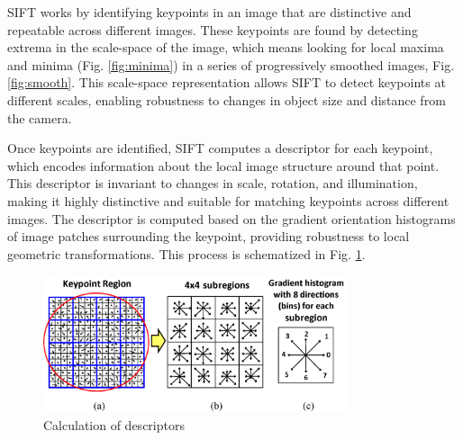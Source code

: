 \documentclass[12pt]{article}
\begin{document}
SIFT works by identifying keypoints in an image that are distinctive and repeatable across different images. These keypoints are found by detecting extrema in the scale-space of the image, which means looking for local maxima and minima (Fig. \ref{fig:minima}) in a series of progressively smoothed images, Fig. \ref{fig:smooth}. This scale-space representation allows SIFT to detect keypoints at different scales, enabling robustness to changes in object size and distance from the camera.

\begin{figure}[H]
    \centering
     \quad
\end{figure}
\setcounter{figure}{1}
\setcounter{subfigure}{0}

Once keypoints are identified, SIFT computes a descriptor for each keypoint, which encodes information about the local image structure around that point. This descriptor is invariant to changes in scale, rotation, and illumination, making it highly distinctive and suitable for matching keypoints across different images. The descriptor is computed based on the gradient orientation histograms of image patches surrounding the keypoint, providing robustness to local geometric transformations. This process is schematized in Fig. \ref{fig:calculation}.

\begin{figure}[H]
    \centering
    \includegraphics[width=0.8\textwidth]{img/keypoint_calculation.png}
    \caption{Calculation of descriptors \cite{huang_high-performance_2012}}
    \label{fig:calculation}
\end{figure}
\end{document}
